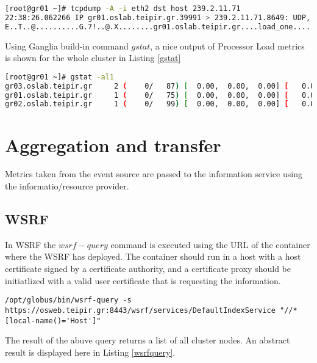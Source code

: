 \begin{lstlisting}[language=bash,caption=XDR sample]
[root@gr01 ~]# tcpdump -A -i eth2 dst host 239.2.11.71
22:38:26.062266 IP gr01.oslab.teipir.gr.39991 > 239.2.11.71.8649: UDP, length 56
E..T..@..........G.7!..@.X........gr01.oslab.teipir.gr....load_one........%.2f..
\end{lstlisting}

Using Ganglia build-in command $gstat$, a nice output of Processor Load metrics is shown for the whole cluster in Listing \ref{gstat}

\begin{lstlisting}[language=bash,caption=Gstat output,label=gstat]
[root@gr01 ~]# gstat -al1
gr03.oslab.teipir.gr     2 (    0/   87) [  0.00,  0.00,  0.00] [   0.0,   0.0,   0.0,  99.9,   0.1] OFF
gr01.oslab.teipir.gr     1 (    0/   75) [  0.00,  0.00,  0.00] [   0.0,   0.0,   0.0,  99.9,   0.0] OFF
gr02.oslab.teipir.gr     1 (    0/   99) [  0.00,  0.00,  0.00] [   0.0,   0.0,   0.1,  99.9,   0.0] OFF
\end{lstlisting}

\section{Aggregation and transfer}

Metrics taken from the event source are passed to the information service using the informatio/resource provider.

\subsection{WSRF}

In WSRF the $wsrf-query$ command is executed using the URL of the container where the WSRF has deployed. The container should run in a host with a host certificate signed by a certificate authority, and a certificate proxy should be initiatlized with a valid user certificate that is requesting the information. 

\begin{lstlisting}
/opt/globus/bin/wsrf-query -s https://osweb.teipir.gr:8443/wsrf/services/DefaultIndexService "//*[local-name()='Host']"
\end{lstlisting}

The result of the abuve query returns a list of all cluster nodes. An abstract result is displayed here in Listing \ref{wsrfquery}.

